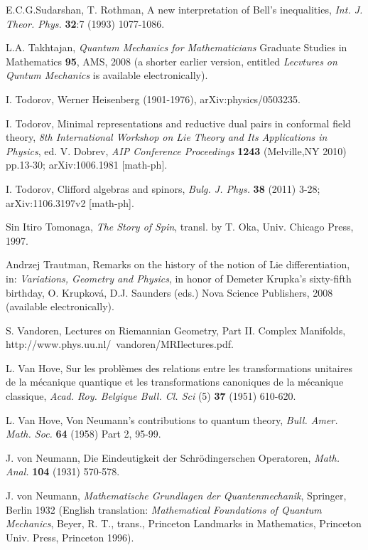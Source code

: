 \begin{thebibliography}{000}
 E.C.G.Sudarshan, T. Rothman, A new interpretation of Bell's inequalities, {\it Int. J.
Theor. Phys.} {\bf 32}:7 (1993) 1077-1086.

 L.A. Takhtajan, {\it Quantum Mechanics for Mathematicians} Graduate Studies in Mathematics {\bf 95}, AMS, 2008 (a shorter earlier version, entitled {\it Lecvtures on Quntum Mechanics} is available electronically).

 I. Todorov, Werner Heisenberg (1901-1976), arXiv:physics/0503235.

 I. Todorov, Minimal representations and reductive dual pairs
 in conformal field theory, {\it 8th International Workshop on Lie Theory and
Its Applications in Physics}, ed. V. Dobrev, {\it AIP Conference Proceedings}
{\bf 1243} (Melville,NY 2010) pp.13-30; arXiv:1006.1981 [math-ph].

 I. Todorov,  Clifford algebras and spinors, {\it Bulg. J. Phys.} {\bf 38} (2011) 3-28;
 arXiv:1106.3197v2 [math-ph].
                                     

  Sin Itiro Tomonaga, {\it The Story of Spin}, transl. by T. Oka,  
 Univ. Chicago Press, 1997. 

 Andrzej Trautman, Remarks on the history of the notion of Lie
differentiation, in: {\it Variations, Geometry and Physics}, in honor of Demeter
Krupka's sixty-fifth birthday, O. Krupkov\'a, D.J. Saunders (eds.) Nova Science
 Publishers, 2008 (available electronically).

 S. Vandoren, Lectures on Riemannian Geometry, Part II. Complex
Manifolds, http://www.phys.uu.nl/~vandoren/MRIlectures.pdf.

 L. Van Hove, Sur les probl\`emes des relations entre les transformations unitaires de la
m\'ecanique quantique et les transformations canoniques de la m\'ecanique classique, {\it Acad. Roy. Belgique
Bull. Cl. Sci} (5) {\bf 37} (1951) 610-620.

 L. Van Hove, Von Neumann's contributions to quantum theory, {\it Bull. Amer. Math. Soc.} {\bf 64} (1958) Part 2, 95-99.

 J. von Neumann, Die Eindeutigkeit der Schr\"odingerschen Operatoren, {\it Math. Anal.}
{\bf 104} (1931) 570-578.

 J. von Neumann, {\it Mathematische Grundlagen der Quantenmechanik}, Springer, Berlin 1932 (English translation: {\it Mathematical Foundations of Quantum Mechanics}, Beyer, R. T., trans., Princeton Landmarks in Mathematics, Princeton Univ. Press, Princeton 1996).


\end{thebibliography}
